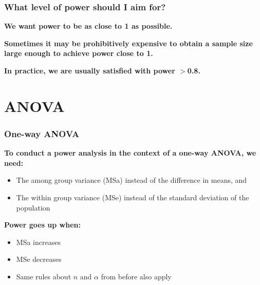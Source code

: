 \documentclass[color=usenames,dvipsnames]{beamer}\usepackage[]{graphicx}\usepackage[]{color}
\begin{document}
\begin{frame}
  \frametitle{What level of power should I aim for?}
  {\bf We want power to be as close to 1 as possible.} \par
  \pause
  \vspace{1cm}
  {\bf Sometimes it may be prohibitively expensive to obtain a sample
    size large enough to achieve power close to 1.} \par
  \pause
  \vspace{1cm}
  {\bf In practice, we are usually satisfied with power $>$0.8. }
\end{frame}




\section{ANOVA}


\begin{frame}
  \frametitle{One-way ANOVA}
  \large
  {\bf To conduct a power analysis in the context of a one-way ANOVA,
    we need:}
  \begin{itemize}
    \item The among group variance (MSa) instead of the difference in means, and
    \item The within group variance (MSe) instead of the standard deviation
      of the population
  \end{itemize}
  \pause
  \vfill
  {\bf Power goes up when:}
  \begin{itemize}
    \item MSa increases
    \item MSe decreases
    \item Same rules about $n$ and $\alpha$ from before also apply
  \end{itemize}
\end{frame}
\end{document}
